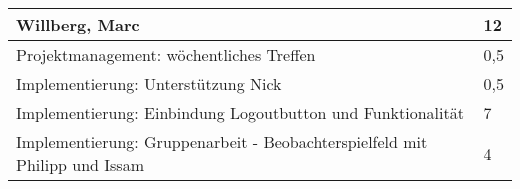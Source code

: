 \documentclass[a4paper,11pt]{scrartcl}
\begin{document}
\begin{longtable}{| p{13.8cm} | C{2.4cm} |}

	\textbf{Willberg, Marc} & \textbf{12}\\ %
	\hline

  Projektmanagement: wöchentliches Treffen
	&
  0,5
	\\
	\hline

  Implementierung: Unterstützung Nick
	&
  0,5
	\\
	\hline

  Implementierung: Einbindung Logoutbutton und Funktionalität
	&
  7
	\\
	\hline

  Implementierung: Gruppenarbeit - Beobachterspielfeld mit Philipp und Issam
	&
  4
	\\
	\hline

\end{longtable}
\end{document}
